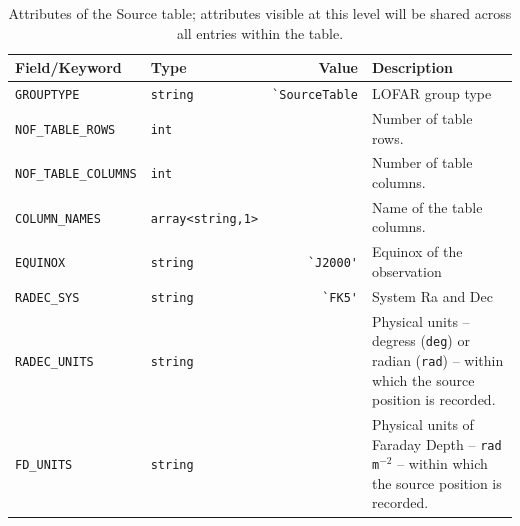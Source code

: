 \documentclass[a4paper,10pt,bibtotoc]{scrartcl}
\begin{document}
\begin{table}[htbp]
  \centering
  \begin{tabular}{|llrp{6.5cm}|}
    \hline
    \sc Field/Keyword & \sc Type & \sc Value & \sc Description \\
    \hline \hline                    
    \small\verb|GROUPTYPE|         &  \small\verb|string|
                                   & \verb|`SourceTable|
                                   & LOFAR group type \\
    \small\verb|NOF_TABLE_ROWS|    & \small\verb|int| 
                                   &
                                   & Number of table rows. \\
    \small\verb|NOF_TABLE_COLUMNS| & \small\verb|int|
                                   &
                                   & Number of table columns. \\
    \small\verb|COLUMN_NAMES|      & \small{\verb|array<string,1>|} 
                                   &
                                   & Name of the table columns. \\
    \small \verb|EQUINOX|          & \small\verb|string|
                                   & \verb|`J2000'|
                                   & Equinox of the observation \\
    \small\verb|RADEC_SYS|         & \small\verb|string|
                                   & \verb|`FK5'|
                                   & System Ra and Dec \\
    \small\verb|RADEC_UNITS|       & \small\verb|string|
                                   &
                                   & Physical units -- degress
                                   (\texttt{deg}) or radian (\texttt{rad})
                                   -- within which the source position is
                                   recorded. \\ 
    \small\verb|FD_UNITS|          & \small\verb|string|
                                   &
                                   & Physical units of Faraday Depth -- \texttt{rad}
                                   \texttt{m}$^{-2}$  -- within which the source
                                   position is recorded. \\ 
    \hline
  \end{tabular}
  \caption[Attributes of the Source table]{Attributes of the Source table; attributes visible at this
    level will be shared across all entries within the table.}
  \label{tab:source table attributes}
\end{table}
\end{document}
